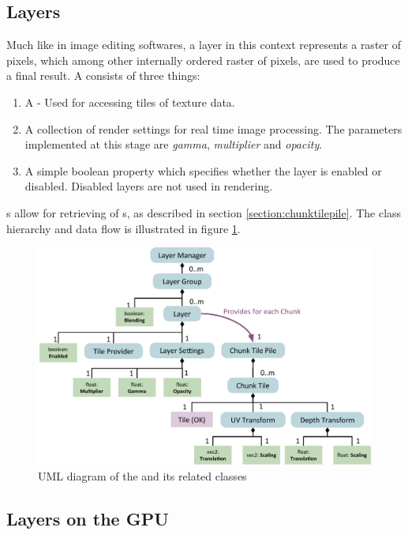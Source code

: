 \subsection{Layers}
Much like in image editing softwares, a layer in this context represents a raster of pixels, which among other internally ordered raster of pixels, are used to produce a final result. A  consists of three things:

\begin{enumerate}
\item A  - Used for accessing tiles of texture data.
\item A collection of render settings for real time image processing. The parameters implemented at this stage are \emph{gamma}, \emph{multiplier} and \emph{opacity}.
\item A simple boolean property which specifies whether the layer is enabled or disabled. Disabled layers are not used in rendering.
\end{enumerate}

s allow for retrieving of s, as described in section \ref{section:chunktilepile}. The class hierarchy and data flow is illustrated in figure \ref{fig:layermanager}.

\begin{figure}[htbp]
    \centering
    \includegraphics[width=\textwidth]{figures/implementation/layers/layermanager.pdf}
    \caption{UML diagram of the  and its related classes}
    \label{fig:layermanager}
\end{figure}

\subsection{Layers on the GPU}

